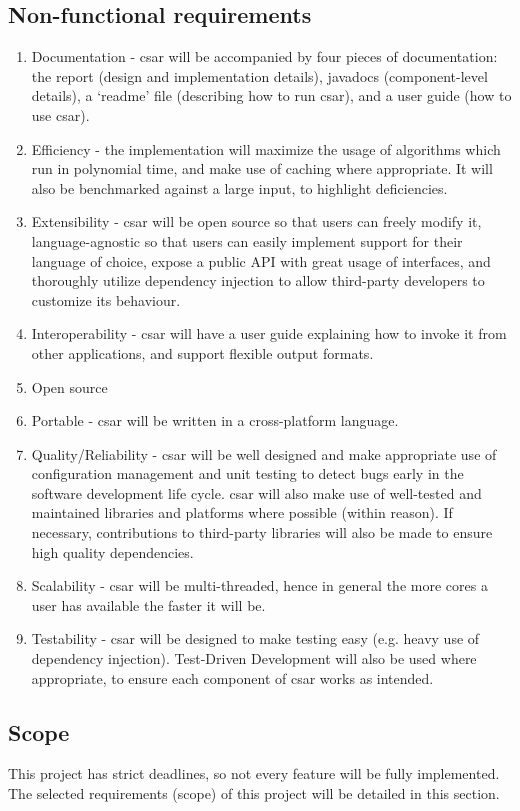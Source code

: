 \documentclass[12pt, letterpaper]{article}
\begin{document}
\subsection{Non-functional requirements}
\label{sec:NonFunctionalRequirements}
\begin{enumerate}
  \item Documentation - csar will be accompanied by four pieces of documentation: the report (design and implementation details), javadocs (component-level details), a `readme' file (describing how to run csar), and a user guide (how to use csar).
  \item Efficiency - the implementation will maximize the usage of algorithms which run in polynomial time, and make use of caching where appropriate.
  It will also be benchmarked against a large input, to highlight deficiencies.
  \item Extensibility - csar will be open source so that users can freely modify it, language-agnostic so that users can easily implement support for their language of choice, expose a public API with great usage of interfaces, and thoroughly utilize dependency injection to allow third-party developers to customize its behaviour.
  \item Interoperability - csar will have a user guide explaining how to invoke it from other applications, and support flexible output formats.
  \item Open source
  \item Portable - csar will be written in a cross-platform language.
  \item Quality/Reliability - csar will be well designed and make appropriate use of configuration management and unit testing to detect bugs early in the software development life cycle.
  csar will also make use of well-tested and maintained libraries and platforms where possible (within reason).
  If necessary, contributions to third-party libraries will also be made to ensure high quality dependencies.
  \item Scalability - csar will be multi-threaded, hence in general the more cores a user has available the faster it will be.
  \item Testability - csar will be designed to make testing easy (e.g. heavy use of dependency injection).
  Test-Driven Development will also be used where appropriate, to ensure each component of csar works as intended.
\end{enumerate}

\subsection{Scope}
This project has strict deadlines, so not every feature will be fully implemented.
The selected requirements (scope) of this project will be detailed in this section.
\end{document}
